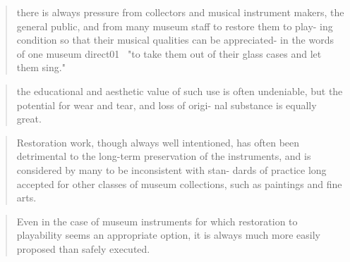 \begin{quotation}
    there is always pressure from collectors and musical instrument makers, the
    general public, and from many museum staff to restore them to play- ing
    condition so that their musical qualities can be appreciated- in the words
    of one museum direct01~ "to take them out of their glass cases and let them
    sing." 
\end{quotation}

\begin{quotation}
    the educational and aesthetic value of such use is often undeniable, but the
potential for wear and tear, and loss of origi- nal substance is equally great.
\end{quotation}

\begin{quotation}
    Restoration work, though always well intentioned, has often been detrimental
    to the long-term preservation of the instruments, and is considered by many
    to be inconsistent with stan- dards of practice long accepted for other
    classes of museum collections, such as paintings and fine arts.
\end{quotation}

\begin{quotation}
    Even in the case of museum instruments for which restoration to playability
    seems an appropriate option, it is always much more easily proposed than
    safely executed.
\end{quotation}

